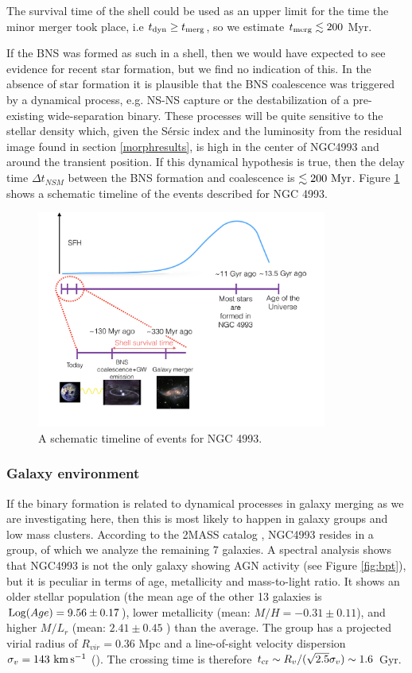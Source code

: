 The survival time of the shell could be used as an upper limit for the time the minor merger took place, i.e  $t_{\rm dyn} \geq t_{\rm merg} $, so we estimate $t_{\rm merg}  \lesssim  200$ Myr.

If the BNS was formed as such in a shell, then we would have expected to see evidence for recent star formation, but we find no indication of this. In the absence of star formation it is plausible that the BNS coalescence was triggered by a dynamical process, e.g. NS-NS capture or the destabilization of a pre-existing wide-separation binary. These processes will be quite sensitive to the stellar density which, given the S\'ersic index and the luminosity from the residual image found in section \ref{morphresults}, is high in the center of NGC4993 and around the transient position. If this dynamical hypothesis is true, then the delay time $\Delta t_{NSM}$ between the BNS formation and coalescence is $\lesssim 200~{\rm Myr}$. Figure \ref{timeline} shows a schematic timeline of the events described for NGC 4993.

\begin{figure}
\centering
\includegraphics[width=0.85\textwidth]{./chapters/chapter3/Figures/timeline.pdf}
\caption{A schematic timeline of events for NGC 4993.}\label{timeline}\end{figure}


\subsubsection{Galaxy environment}
If the binary formation is related to dynamical processes in galaxy merging as we are investigating here, then this is most likely to happen in galaxy groups and low mass clusters.
According to the 2MASS catalog \citep{tully}, NGC4993 resides in a group, of which we analyze the remaining 7 galaxies. A spectral analysis shows that NGC4993 is not the only galaxy showing AGN activity (see Figure \ref{fig:bpt}), but it is peculiar in terms of age, metallicity and mass-to-light ratio. It shows an older stellar population (the mean age of the other 13 galaxies is ${\rm Log} (Age) = 9.56\pm0.17$), lower metallicity (mean: $M/H=-0.31 \pm 0.11$), and higher $M/L_r$ (mean: $2.41\pm0.45$ ) than the average. The group has a projected virial radius of $R_{vir} = 0.36$ Mpc and a line-of-sight velocity dispersion $\sigma_v = 143~ {\rm km\, s^{-1}}$ (\citealt{tully}). The crossing time is therefore $t_{\rm cr} \sim R_v/(\sqrt{2.5}\sigma_v)\sim 1.6$ Gyr.  

